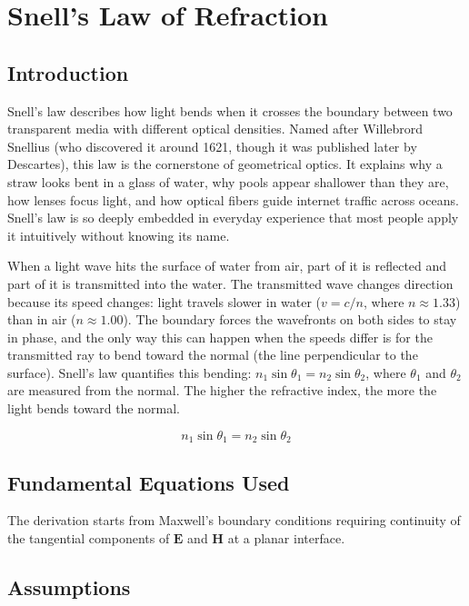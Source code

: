 \chapter{Snell's Law of Refraction}

\section*{Introduction}

Snell's law describes how light bends when it crosses the boundary between two transparent media with different optical densities. Named after Willebrord Snellius (who discovered it around 1621, though it was published later by Descartes), this law is the cornerstone of geometrical optics. It explains why a straw looks bent in a glass of water, why pools appear shallower than they are, how lenses focus light, and how optical fibers guide internet traffic across oceans. Snell's law is so deeply embedded in everyday experience that most people apply it intuitively without knowing its name.

When a light wave hits the surface of water from air, part of it is reflected and part of it is transmitted into the water. The transmitted wave changes direction because its speed changes: light travels slower in water ($v = c/n$, where $n \approx 1.33$) than in air ($n \approx 1.00$). The boundary forces the wavefronts on both sides to stay in phase, and the only way this can happen when the speeds differ is for the transmitted ray to bend toward the normal (the line perpendicular to the surface). Snell's law quantifies this bending: $n_1\sin\theta_1 = n_2\sin\theta_2$, where $\theta_1$ and $\theta_2$ are measured from the normal. The higher the refractive index, the more the light bends toward the normal.


\begin{equation}
n_1\sin\theta_1 = n_2\sin\theta_2
\end{equation}

\section*{Fundamental Equations Used}

The derivation starts from Maxwell's boundary conditions requiring continuity of the tangential components of $\mathbf{E}$ and $\mathbf{H}$ at a planar interface.

\section*{Assumptions}


